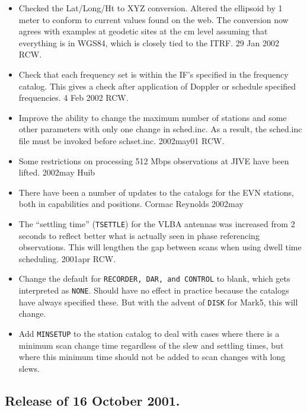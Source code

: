 \documentclass{report}
\begin{document}
\begin{itemize}
\item Checked the Lat/Long/Ht to XYZ conversion.  Altered the
ellipsoid by 1 meter to conform to current values found on the web.
The conversion now agrees with examples at geodetic sites at the cm
level assuming that everything is in WGS84, which is closely tied to
the ITRF.  29 Jan 2002 RCW.

\item Check that each frequency set is within the IF's specified in
the frequency catalog.  This gives a check after application of
Doppler or schedule specified frequencies.  4 Feb 2002  RCW.

\item Improve the ability to change the maximum number of stations
and some other parameters with only one change in sched.inc.  As a
result, the sched.inc file must be invoked before schset.inc.
2002may01  RCW.

\item Some restrictions on processing 512 Mbps observations at
JIVE have been lifted.  2002may  Huib

\item There have been a number of updates to the catalogs for the EVN
stations, both in capabilities and positions.  Cormac Reynolds 2002may

\item The ``settling time'' ({\tt TSETTLE}) for the VLBA antennas was
increased from 2 seconds to reflect better what is actually seen in
phase referencing observations.  This will lengthen the gap between
scans when using dwell time scheduling.  2001apr RCW.

\item Change the default for {\tt RECORDER, DAR, and CONTROL} to blank,
which gets interpreted as {\tt NONE}.  Should have no effect in
practice because the catalogs have always specified these.  But
with the advent of {\tt DISK} for Mark5, this will change.

\item Add {\tt MINSETUP} to the station catalog to deal with cases
where there is a minimum scan change time regardless of the slew
and settling times, but where this minimum time should not be
added to scan changes with long slews.

\end{itemize}

\subsection{\label{SSSEC:14OCT2001}Release of 16 October 2001.}
\end{document}

